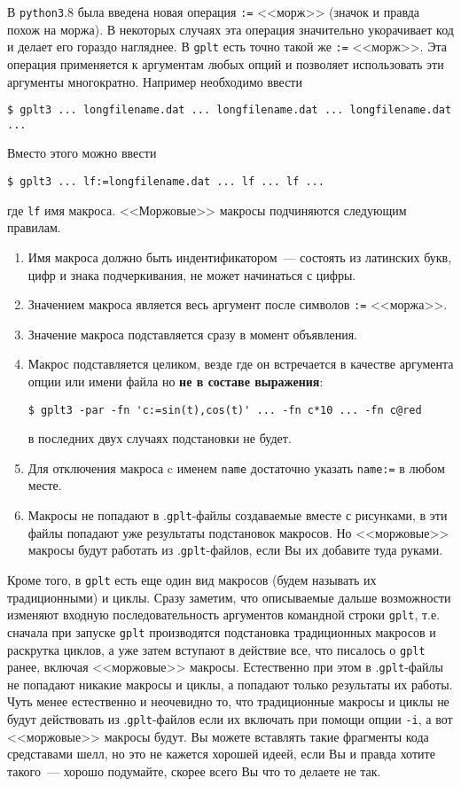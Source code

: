\documentclass[12pt]{article}
\def\gplt{{\tt gplt}}
\def\python{{\tt python3}}
\begin{document}
В \python.8 была введена новая операция \verb':=' <<морж>> (значок и правда похож на моржа).
В некоторых случаях эта операция значительно укорачивает код и делает его гораздо нагляднее.
В \gplt{} есть точно такой же \verb':=' <<морж>>. Эта операция применяется к аргументам любых опций
и позволяет использовать эти аргументы многократно.  Например необходимо ввести
\begin{verbatim}
$ gplt3 ... longfilename.dat ... longfilename.dat ... longfilename.dat ...
\end{verbatim}
Вместо этого можно ввести 
\begin{verbatim}
$ gplt3 ... lf:=longfilename.dat ... lf ... lf ...
\end{verbatim}
где \verb'lf' имя макроса. <<Моржовые>> макросы подчиняются следующим правилам.
\begin{enumerate}
\item Имя макроса должно быть индентификатором~--- состоять из латинских букв, цифр и знака подчеркивания, не может начинаться с цифры.
\item Значением макроса является весь аргумент после символов \verb':=' <<моржа>>.
\item Значение макроса подставляется сразу в момент объявления.
\item Макрос подставляется целиком, везде где он встречается в качестве аргумента опции или имени файла но {\bf не в составе выражения}:
\begin{verbatim}
$ gplt3 -par -fn 'c:=sin(t),cos(t)' ... -fn c*10 ... -fn c@red
\end{verbatim}
  в последних двух случаях подстановки не будет.
\item Для отключения макроса c именем \verb'name' достаточно указать \verb'name:=' в любом месте.
\item Макросы не попадают в .\gplt-файлы создаваемые вместе с рисунками, в эти файлы попадают уже результаты подстановок макросов.
  Но <<моржовые>> макросы будут работать из .\gplt-файлов, если Вы их добавите туда руками.
\end{enumerate}

Кроме того, в \gplt{} есть еще один вид макросов (будем называть их традиционными) и циклы. Сразу заметим, что описываемые дальше возможности
изменяют входную последовательность аргументов командной строки \gplt, т.е. сначала при запуске \gplt{} производятся подстановка традиционных макросов и
раскрутка циклов, а уже затем вступают в действие все, что писалось о \gplt{} ранее, включая <<моржовые>> макросы. Естественно при этом
в .\gplt-файлы не попадают никакие макросы и циклы, а попадают только результаты их работы. Чуть менее естественно и неочевидно то, что
традиционные макросы и циклы не будут действовать из .\gplt-файлов если их включать при помощи опции \verb'-i', а вот <<моржовые>> макросы будут.
Вы можете вставлять такие фрагменты кода средставами шелл, но это не кажется хорошей идеей, если Вы и правда хотите такого~---
хорошо подумайте, скорее всего Вы что то делаете не так.
\end{document}
